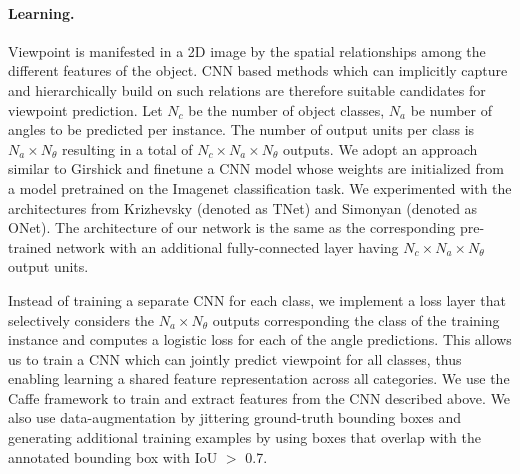 \paragraph{Learning.}
Viewpoint is manifested in a 2D image by the spatial relationships among the different features of the object. CNN based methods which can implicitly capture and hierarchically build on such relations are therefore suitable candidates for viewpoint prediction. Let $N_c$ be the number of object classes, $N_a$ be number of angles to be predicted per instance. The number of output units per class is $N_{a} \times N_{\theta}$ resulting in a total of $N_{c} \times N_{a} \times N_{\theta}$ outputs. We adopt an approach similar to Girshick \etal \cite{rcnn} and finetune a CNN model whose weights are initialized from a model pretrained on the Imagenet \cite{imagenet_cvpr09} classification task. We experimented with the architectures from Krizhevsky \etal \cite{Krizhevsky} (denoted as TNet) and Simonyan \etal \cite{Simonyan14c} (denoted as ONet). The architecture of our network is the same as the corresponding pre-trained network with an additional fully-connected layer having $N_{c} \times N_{a} \times N_{\theta}$ output units.

Instead of training a separate CNN for each class, we implement a loss layer that selectively considers the $N_{a} \times N_{\theta}$ outputs corresponding the class of the training instance and computes  a logistic loss for each of the angle predictions. This allows us to train a CNN which can jointly predict viewpoint for all classes, thus enabling learning a shared feature representation across all categories. We use the Caffe framework \cite{jia2014caffe} to train and extract features from the CNN described above. We also use data-augmentation by jittering ground-truth bounding boxes and generating additional training examples by using boxes that overlap with the annotated bounding box with IoU $>$ 0.7.
